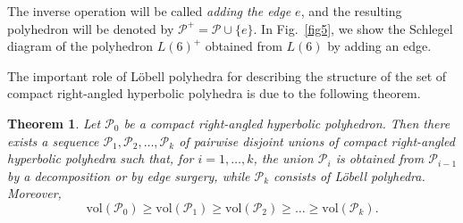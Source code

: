 \documentclass{amsart}
\newtheorem{theorem}{Theorem}[section]
\newcommand{\vol}{\mathrm{vol}}
\begin{document}
The inverse operation will be called \textit{adding the edge $e$}, and the resulting polyhedron will be denoted by $\mathcal P^+ = \mathcal P \cup \{e\}$. In Fig.~\ref{fig5}, we show the Schlegel diagram of the polyhedron $L(6)^+$ obtained from $L(6)$ by adding an edge.

The important role of L\"obell polyhedra for describing the structure of the set of compact right-angled hyperbolic polyhedra is due to the following theorem.

\begin{theorem} \cite[Th.~9.1]{In08} \label{theorem3.1}
Let $\mathcal P_0$ be a compact right-angled hyperbolic polyhedron. Then there exists a sequence $\mathcal P_1, \mathcal P_2, \ldots, \mathcal P_k$ of pairwise disjoint unions of compact right-angled hyperbolic polyhedra such that, for $i=1, \ldots, k$, the union $\mathcal P_i$ is obtained from $\mathcal P_{i-1}$ by a decomposition or by edge surgery, while $\mathcal P_k$ consists of L\"obell polyhedra. Moreover,
$$
\vol(\mathcal P_0) \geq \vol(\mathcal P_1) \geq \vol(\mathcal P_2) \geq \dots \geq \vol(\mathcal P_k). 
$$
\end{theorem}
\end{document}
